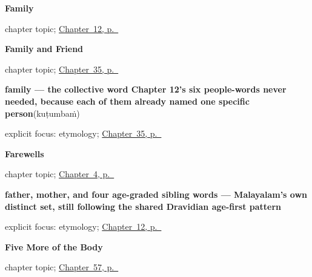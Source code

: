 \noindent\begin{minipage}[t]{\linewidth}
\raggedright
\textbf{Family}\par
\footnotesize chapter topic; \hyperref[ch:ml-family]{Chapter~12, p.~\pageref*{ch:ml-family}}
\end{minipage}\par\smallskip

\noindent\begin{minipage}[t]{\linewidth}
\raggedright
\textbf{Family and Friend}\par
\footnotesize chapter topic; \hyperref[ch:ml-family-and-friend]{Chapter~35, p.~\pageref*{ch:ml-family-and-friend}}
\end{minipage}\par\smallskip

\noindent\begin{minipage}[t]{\linewidth}
\raggedright
\textbf{family — the collective word Chapter 12's six people-words never needed, because each of them already named one specific person}\enspace\emph{}\enspace(kuṭumbaṁ)\par
\footnotesize explicit focus: etymology; \hyperref[ch:ml-family-and-friend]{Chapter~35, p.~\pageref*{ch:ml-family-and-friend}}
\end{minipage}\par\smallskip

\noindent\begin{minipage}[t]{\linewidth}
\raggedright
\textbf{Farewells}\par
\footnotesize chapter topic; \hyperref[ch:farewells]{Chapter~4, p.~\pageref*{ch:farewells}}
\end{minipage}\par\smallskip

\noindent\begin{minipage}[t]{\linewidth}
\raggedright
\textbf{father, mother, and four age-graded sibling words — Malayalam's own distinct set, still following the shared Dravidian age-first pattern}\enspace\emph{     }\par
\footnotesize explicit focus: etymology; \hyperref[ch:ml-family]{Chapter~12, p.~\pageref*{ch:ml-family}}
\end{minipage}\par\smallskip

\noindent\begin{minipage}[t]{\linewidth}
\raggedright
\textbf{Five More of the Body}\par
\footnotesize chapter topic; \hyperref[ch:ml-five-more-of-the-body]{Chapter~57, p.~\pageref*{ch:ml-five-more-of-the-body}}
\end{minipage}\par\smallskip

